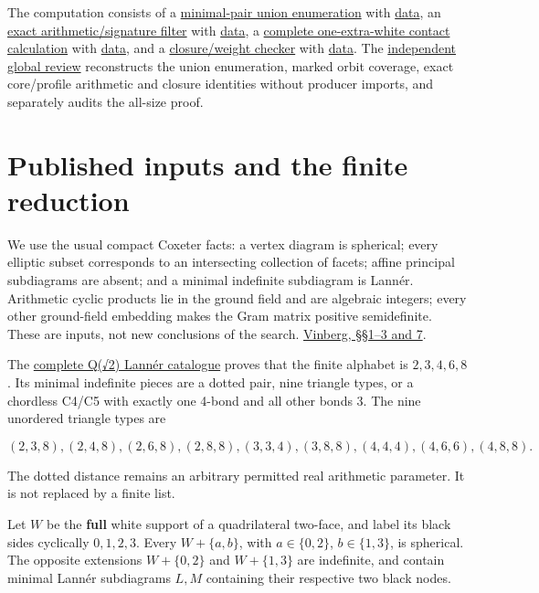 \documentclass[
  10pt,
]{report}
\begin{document}
The computation consists of a
\href{../scripts/fresh_sqrt2_quad_exhaustion_20261015.py}{minimal-pair
union enumeration} with
\href{fresh_sqrt2_quad_exhaustion_20261015.json}{data}, an
\href{../scripts/fresh_sqrt2_quad_exhaustion_20261015_cores.py}{exact
arithmetic/signature filter} with
\href{fresh_sqrt2_quad_exhaustion_20261015_cores.json}{data}, a
\href{../scripts/fresh_sqrt2_quad_exhaustion_20261015_extensions.py}{complete
one-extra-white contact calculation} with
\href{fresh_sqrt2_quad_exhaustion_20261015_extensions.json}{data}, and a
\href{../scripts/fresh_sqrt2_quad_exhaustion_20261015_closure.py}{closure/weight
checker} with
\href{fresh_sqrt2_quad_exhaustion_20261015_closure.json}{data}. The
\href{fresh_sqrt2_quad_exhaustion_20261015_review.md}{independent global
review} reconstructs the union enumeration, marked orbit coverage, exact
core/profile arithmetic and closure identities without producer imports,
and separately audits the all-size proof.

\section{Published inputs and the finite
reduction}\label{published-inputs-and-the-finite-reduction}

We use the usual compact Coxeter facts: a vertex diagram is spherical;
every elliptic subset corresponds to an intersecting collection of
facets; affine principal subdiagrams are absent; and a minimal
indefinite subdiagram is Lannér. Arithmetic cyclic products lie in the
ground field and are algebraic integers; every other ground-field
embedding makes the Gram matrix positive semidefinite. These are inputs,
not new conclusions of the search.
\href{https://www.mathnet.ru/php/getFT.phtml?jrnid=mmo&option_lang=rus&paperid=444&what=fullt}{Vinberg,
§§1--3 and 7}.

The \href{fresh_sqrt2_lanner_catalogue_20261015.md}{complete Q(√2)
Lannér catalogue} proves that the finite alphabet is \(2,3,4,6,8\). Its
minimal indefinite pieces are a dotted pair, nine triangle types, or a
chordless C4/C5 with exactly one 4-bond and all other bonds 3. The nine
unordered triangle types are

\[
(2,3,8),(2,4,8),(2,6,8),(2,8,8),(3,3,4),
(3,8,8),(4,4,4),(4,6,6),(4,8,8).
\]

The dotted distance remains an arbitrary permitted real arithmetic
parameter. It is not replaced by a finite list.

Let \(W\) be the \textbf{full} white support of a quadrilateral
two-face, and label its black sides cyclically \(0,1,2,3\). Every
\(W+\{a,b\}\), with \(a\in\{0,2\}\), \(b\in\{1,3\}\), is spherical. The
opposite extensions \(W+\{0,2\}\) and \(W+\{1,3\}\) are indefinite, and
contain minimal Lannér subdiagrams \(L,M\) containing their respective
two black nodes.
\end{document}
